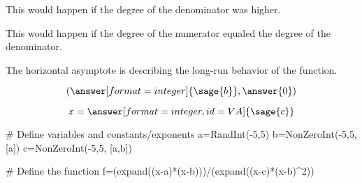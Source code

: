 {\begin{problem}
\begin{problem}
\begin{problem}
\begin{feedback}[HA=0]
This would happen if the degree of the denominator was higher.
\end{feedback}

\begin{feedback}[HA=1]
This would happen if the degree of the numerator equaled the degree of the denominator.
\end{feedback}

\begin{feedback}[correct]
The horizontal asymptote is describing the long-run behavior of the function.
\end{feedback}


\end{problem}

\[(\answer[format=integer]{\sage{b}}, \answer{0})\]

\end{problem}

\[x=\answer[format=integer,id=VA]{\sage{c}}\]

\end{problem}}%

\begin{sagesilent}
# Define variables and constants/exponents
a=RandInt(-5,5)
b=NonZeroInt(-5,5, [a])
c=NonZeroInt(-5,5, [a,b])

# Define the function
f=(expand((x-a)*(x-b)))/(expand((x-c)*(x-b)^2))

\end{sagesilent}
 
